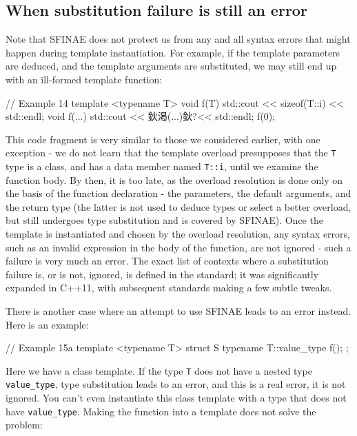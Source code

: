 \subsection{When substitution failure is still an error}

Note that SFINAE does not protect us from any and all syntax errors that might happen during template instantiation. For example, if the template parameters are deduced, and the template arguments are substituted, we may still end up with an ill-formed template function:

\begin{code}
// Example 14
template <typename T> void f(T) {
  std::cout << sizeof(T::i) << std::endl;
}
void f(...) { std::cout << 鈥渇(...)鈥?<< std::endl; }
f(0);
\end{code}

This code fragment is very similar to those we considered earlier, with one exception - we do not learn that the template overload presupposes that the \texttt{T} type is a class, and has a data member named \texttt{T::i}, until we examine the function body. By then, it is too late, as the overload resolution is done only on the basis of the function declaration - the parameters, the default arguments, and the return type (the latter is not used to deduce types or select a better overload, but still undergoes type substitution and is covered by SFINAE). Once the template is instantiated and chosen by the overload resolution, any syntax errors, such as an invalid expression in the body of the function, are not ignored - such a failure is very much an error. The exact list of contexts where a substitution failure is, or is not, ignored, is defined in the standard; it was significantly expanded in C++11, with subsequent standards making a few subtle tweaks.

There is another case where an attempt to use SFINAE leads to an error instead. Here is an example:

\begin{code}
// Example 15a
template <typename T> struct S {
  typename T::value_type f();
};
\end{code}

Here we have a class template. If the type \texttt{T} does not have a nested type \texttt{value\_type}, type substitution leads to an error, and this is a real error, it is not ignored. You can't even instantiate this class template with a type that does not have \texttt{value\_type}. Making the function into a template does not solve the problem:

